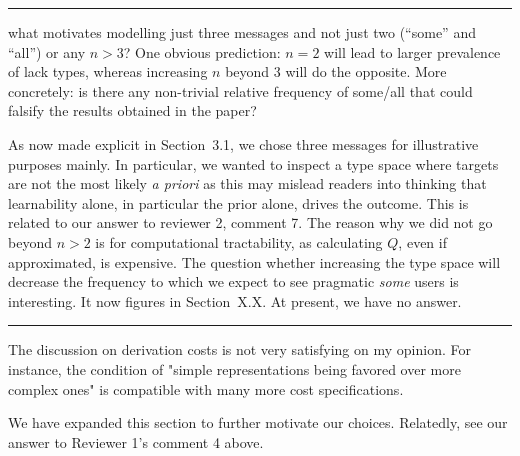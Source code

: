 \documentclass[12pt,a4paper]{article}
\newcommand{\hl}[1]{\textcolor[rgb]{.8,.33,.0}{#1}}%
\begin{document}
%
\noindent\rule{\textwidth}{1pt}

\begin{mdframed}[backgroundcolor=gray!25,linecolor=gray!25,frametitle= Reviewer \thereviewerCounter~comment \thereviewerCommentCounter \hfill ~~({\it message amount})]
%
what motivates modelling just three messages and not just two (``some'' and ``all'') or any $n>3$? One obvious prediction: $n=2$ will lead to larger prevalence of lack types, whereas increasing $n$ beyond $3$ will do the opposite. More concretely: is there any non-trivial relative frequency of some/all that could falsify the results obtained in the paper?

%
\end{mdframed}

As now made explicit in Section~3.1, we chose three messages for illustrative purposes mainly. In particular, we wanted to inspect a type space where targets are not the most likely {\em a priori} as this may mislead readers into thinking that learnability alone, in particular the prior alone, drives the outcome. This is related to our answer to reviewer 2, comment 7. The reason why we did not go beyond $n>2$ is for computational tractability, as calculating $Q$, even if approximated, is expensive. The question whether increasing the type space will decrease the frequency to which we expect to see pragmatic {\em some} users is interesting. It now figures in \hl{Section~X.X}. At present, we have no answer. 



\noindent\rule{\textwidth}{1pt}

\begin{mdframed}[backgroundcolor=gray!25,linecolor=gray!25,frametitle= Reviewer \thereviewerCounter~comment \thereviewerCommentCounter \hfill ~~({\it LOT \& complexity})]
%
The discussion on derivation costs is not very satisfying on my opinion. For instance, the condition of "simple representations being favored over more complex ones" is compatible with many more cost specifications.

%
\end{mdframed}

We have expanded this section to further motivate our choices. Relatedly, see our answer to Reviewer 1's comment 4 above.

%
%
%
%
%





\end{document}
